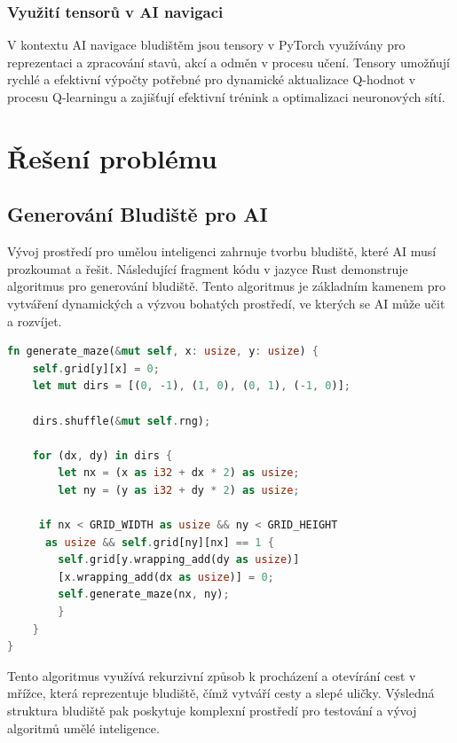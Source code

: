 \documentclass[12pt, a4paper,
twoside,        %
openright
]{report}
\begin{document}
\subsection{Využití tensorů v AI navigaci}
V kontextu AI navigace bludištěm jsou tensory v PyTorch využívány pro reprezentaci a zpracování stavů, akcí a odměn v procesu učení. Tensory umožňují rychlé a efektivní výpočty potřebné pro dynamické aktualizace Q-hodnot v procesu Q-learningu a zajišťují efektivní trénink a optimalizaci neuronových sítí.



\chapter{Řešení problému}

\section{Generování Bludiště pro AI}

Vývoj prostředí pro umělou inteligenci zahrnuje tvorbu bludiště, které AI musí prozkoumat a řešit. Následující fragment kódu v jazyce Rust demonstruje algoritmus pro generování bludiště. Tento algoritmus je základním kamenem pro vytváření dynamických a výzvou bohatých prostředí, ve kterých se AI může učit a rozvíjet.

\begin{lstlisting}[language=rust, caption={Funkce pro generování bludiště v Rustu}]
fn generate_maze(&mut self, x: usize, y: usize) {
	self.grid[y][x] = 0;
	let mut dirs = [(0, -1), (1, 0), (0, 1), (-1, 0)];
		
	dirs.shuffle(&mut self.rng);
		
	for (dx, dy) in dirs {
		let nx = (x as i32 + dx * 2) as usize;
		let ny = (y as i32 + dy * 2) as usize;
			
	 if nx < GRID_WIDTH as usize && ny < GRID_HEIGHT
	  as usize && self.grid[ny][nx] == 1 {
		self.grid[y.wrapping_add(dy as usize)]
		[x.wrapping_add(dx as usize)] = 0;
		self.generate_maze(nx, ny);
		}
	}
}
\end{lstlisting}


Tento algoritmus využívá rekurzivní způsob k procházení a otevírání cest v mřížce, která reprezentuje bludiště, čímž vytváří cesty a slepé uličky. Výsledná struktura bludiště pak poskytuje komplexní prostředí pro testování a vývoj algoritmů umělé inteligence.
\end{document}

